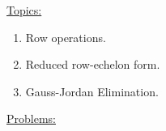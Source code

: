 \underline{Topics:}
	\begin{enumerate}
		\item Row operations.
		\item Reduced row-echelon form.
		\item Gauss-Jordan Elimination.
	\end{enumerate}	
	\underline{Problems:}